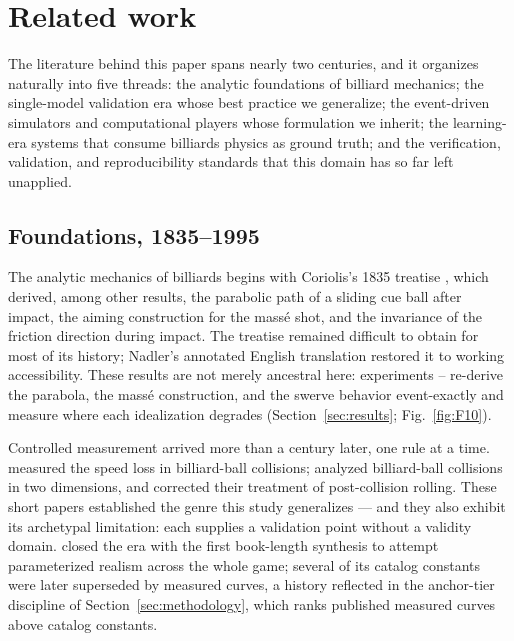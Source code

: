 \section{Related work}
\label{sec:related}

The literature behind this paper spans nearly two centuries, and it
organizes naturally into five threads: the analytic foundations of billiard
mechanics; the single-model validation era whose best practice we
generalize; the event-driven simulators and computational players whose
formulation we inherit; the learning-era systems that consume billiards
physics as ground truth; and the verification, validation, and
reproducibility standards that this domain has so far left unapplied.

\subsection{Foundations, 1835--1995}

The analytic mechanics of billiards begins with Coriolis's 1835 treatise
\citep{coriolis1835}, which derived, among other results, the parabolic
path of a sliding cue ball after impact, the aiming construction for the
mass\'e shot, and the invariance of the friction direction during impact.
The treatise remained difficult to obtain for most of its history;
Nadler's annotated English translation \citep{nadler2005coriolis} restored
it to working accessibility. These results are not merely ancestral here:
experiments -- re-derive the parabola, the mass\'e
construction, and the swerve behavior event-exactly and measure where each
idealization degrades (Section~\ref{sec:results}; Fig.~\ref{fig:F10}).

Controlled measurement arrived more than a century later, one rule at a
time. \citet{bayes1963collision} measured the speed loss in billiard-ball
collisions; \citet{wallace1988billiard} analyzed billiard-ball collisions
in two dimensions, and \citet{onoda1989comment} corrected their treatment
of post-collision rolling. These short papers established the genre this
study generalizes --- and they also exhibit its archetypal limitation:
each supplies a validation point without a validity domain.
\citet{marlow1995physics} closed the era with the first book-length
synthesis to attempt parameterized realism across the whole game; several
of its catalog constants were later superseded by measured curves, a
history reflected in the anchor-tier discipline of
Section~\ref{sec:methodology}, which ranks published measured curves above
catalog constants.

